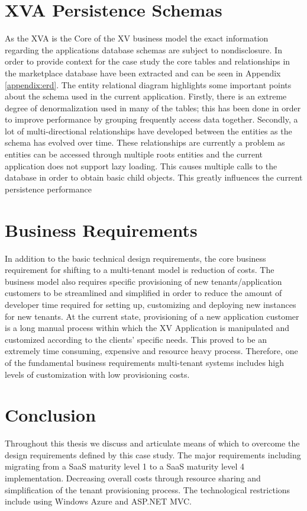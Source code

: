 

\section{XVA Persistence Schemas}

As the XVA is the Core of the XV business model the exact information regarding the applications database schemas are subject to nondisclosure. In order to provide context for the case study the core tables and relationships in the marketplace database have been extracted and can be seen in Appendix \ref{appendix:erd}. The entity relational diagram highlights some important points about the schema used in the current application. Firstly, there is an extreme degree of denormalization used in many of the tables; this has been done in order to improve performance by grouping frequently access data together. Secondly, a lot of multi-directional relationships have developed between the entities as the schema has evolved over time. These relationships are currently a problem as entities can be accessed through multiple roots entities and the current application does not support lazy loading. This causes multiple calls to the database in order to obtain basic child objects. This greatly influences the current persistence performance



\section{Business Requirements}

In addition to the basic technical design requirements, the core business requirement for shifting to a multi-tenant model is reduction of costs. The business model also requires specific provisioning of new tenants/application customers to be streamlined and simplified in order to reduce the amount of developer time required for setting up, customizing and deploying new instances for new tenants. At the current state, provisioning of a new application customer is a long manual process within which the XV Application is manipulated and customized according to the clients' specific needs. This proved to be an extremely time consuming, expensive and resource heavy process. Therefore, one of the fundamental business requirements multi-tenant systems includes high levels of customization with low provisioning costs.



\section{Conclusion}

Throughout this thesis we discuss and articulate means of which to overcome the design requirements defined by this case study. The major requirements including migrating from a SaaS maturity level 1 to a SaaS maturity level 4 implementation. Decreasing overall costs through resource sharing and simplification of the tenant provisioning process. The technological restrictions include using Windows Azure and ASP.NET MVC.
